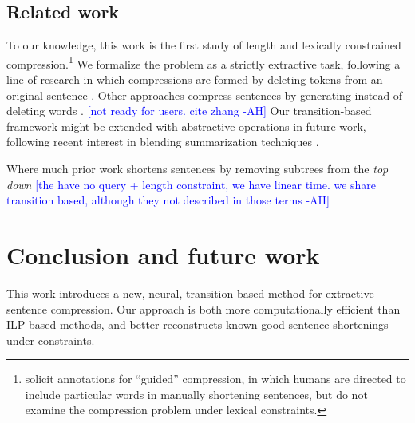 \documentclass[11pt,a4paper]{article}
\newcommand{\ahcomment}[1]{\textcolor{blue}{[#1 -AH]}}
\begin{document}
\subsection{Related work}

To our knowledge, this work is the first study of length and lexically constrained compression.\footnote{\citet{Li2013DocumentSV} solicit annotations for ``guided'' compression, in which humans are directed to include particular words in manually shortening sentences, but do not examine the compression problem under lexical constraints.} We formalize the problem as a strictly extractive task, following a line of research in which compressions are formed by deleting tokens from an original sentence \cite{clarke2008global,filippova2008dependency,filippova2015sentence}. Other approaches compress sentences by generating instead of deleting words \cite{rush2015neural,mallinson18}. \ahcomment{not ready for users. cite zhang} Our transition-based framework might be extended with abstractive operations in future work, following recent interest in blending summarization techniques \cite{P17-1099}.

Where much prior work shortens sentences by removing subtrees from the \textit{top down} \cite{Jing2000SentenceRF,Knight2000StatisticsBasedS,almeida2013fast,Filippova2015FastKS} \ahcomment{the have no query + length constraint, we have linear time. we share transition based, although they not described in those terms}

\section{Conclusion and future work}

This work introduces a new, neural, transition-based method for extractive sentence compression. Our approach is both more computationally efficient than ILP-based methods, and better reconstructs known-good sentence shortenings under constraints. 




%



\end{document}
